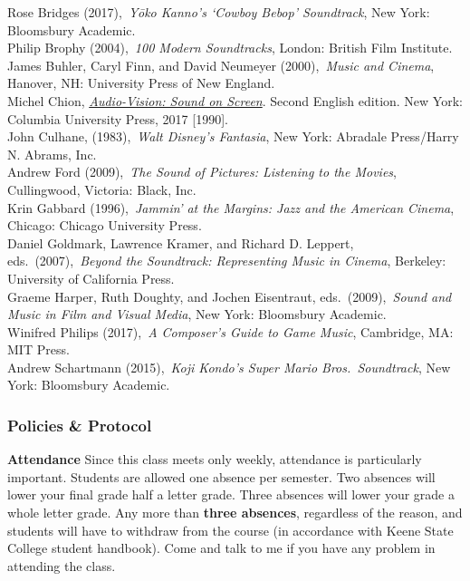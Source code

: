 \documentclass[]{tufte-handout}
\begin{document}
Rose Bridges (2017),~\emph{Yōko Kanno's `Cowboy Bebop' Soundtrack}, New
York: Bloomsbury Academic.\\
Philip Brophy (2004),~\emph{100 Modern Soundtracks}, London: British
Film Institute.\\
James Buhler, Caryl Finn, and David Neumeyer (2000),~\emph{Music and
Cinema}, Hanover, NH: University Press of New England.\\
Michel Chion,
\href{http://0-search.ebscohost.com.ksclib.keene.edu/login.aspx\%3fdirect\%3dtrue\%26db\%3dnlebk\%26AN\%3d2026762\%26site\%3dehost-live\%26scope\%3dsite\%26ebv\%3DEB\%26ppid\%3Dpp_171}{\emph{Audio-Vision:
Sound on Screen}}. Second English edition. New York: Columbia University
Press, 2017 {[}1990{]}.\\
John Culhane, (1983),~\emph{Walt Disney's Fantasia}, New York: Abradale
Press/Harry N. Abrams, Inc.\\
Andrew Ford (2009),~\emph{The Sound of Pictures: Listening to the
Movies}, Cullingwood, Victoria: Black, Inc.\\
Krin Gabbard (1996),~\emph{Jammin' at the Margins: Jazz and the American
Cinema}, Chicago: Chicago University Press.\\
Daniel Goldmark, Lawrence Kramer, and Richard D. Leppert,
eds.~(2007),~\emph{Beyond the Soundtrack: Representing Music in Cinema},
Berkeley: University of California Press.\\
Graeme Harper, Ruth Doughty, and Jochen Eisentraut,
eds.~(2009),~\emph{Sound and Music in Film and Visual Media}, New York:
Bloomsbury Academic.\\
Winifred Philips (2017),~\emph{A Composer's Guide to Game Music},
Cambridge, MA: MIT Press.\\
Andrew Schartmann (2015),~\emph{Koji Kondo's Super Mario
Bros.~Soundtrack}, New York: Bloomsbury Academic.

\hypertarget{policies-protocol}{%
\subsubsection{Policies \& Protocol}\label{policies-protocol}}

\textbf{Attendance} Since this class meets only weekly, attendance is
particularly important. Students are allowed one absence per semester.
Two absences will lower your final grade half a letter grade. Three
absences will lower your grade a whole letter grade. Any more than
\textbf{three absences}, regardless of the reason, and students will
have to withdraw from the course (in accordance with Keene State College
student handbook). Come and talk to me if you have any problem in
attending the class.
\end{document}
